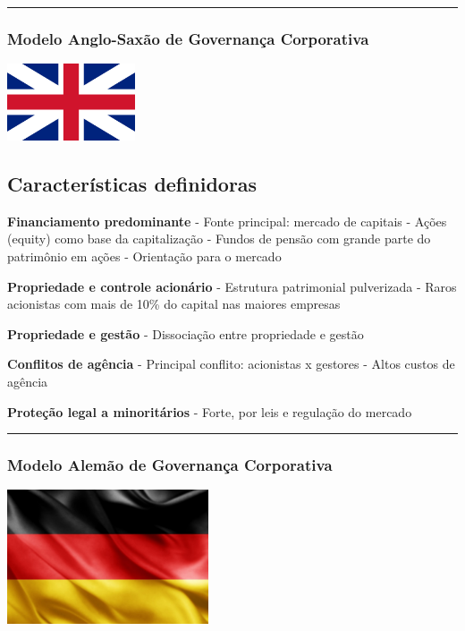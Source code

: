 \documentclass[
]{book}
\begin{document}
\begin{center}\rule{0.5\linewidth}{0.5pt}\end{center}

\subsubsection{Modelo Anglo-Saxão de Governança Corporativa}\label{modelo-anglo-saxuxe3o-de-governanuxe7a-corporativa}

\includegraphics[width=1.48958in,height=\textheight]{images/02-2025-08-12_13/06-modelo_anglo-saxao.jpg}

\subsection{Características definidoras}\label{caracteruxedsticas-definidoras}

\textbf{Financiamento predominante} - Fonte principal: mercado de capitais - Ações (equity) como base da capitalização - Fundos de pensão com grande parte do patrimônio em ações - Orientação para o mercado

\textbf{Propriedade e controle acionário} - Estrutura patrimonial pulverizada - Raros acionistas com mais de 10\% do capital nas maiores empresas

\textbf{Propriedade e gestão} - Dissociação entre propriedade e gestão

\textbf{Conflitos de agência} - Principal conflito: acionistas x gestores - Altos custos de agência

\textbf{Proteção legal a minoritários} - Forte, por leis e regulação do mercado

\begin{center}\rule{0.5\linewidth}{0.5pt}\end{center}

\subsubsection{Modelo Alemão de Governança Corporativa}\label{modelo-alemuxe3o-de-governanuxe7a-corporativa}

\includegraphics[width=2.34375in,height=\textheight]{images/02-2025-08-12_13/07-modelo_alemao.jpg}
\end{document}
